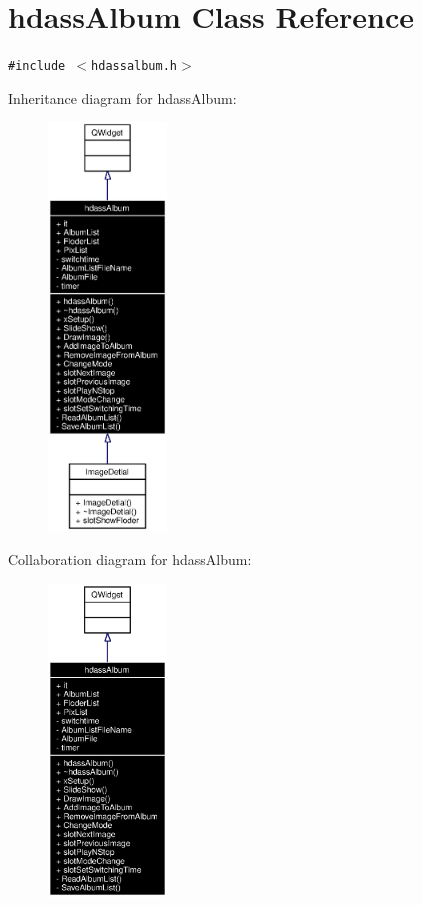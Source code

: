 \section{hdass\-Album Class Reference}
\label{classhdassAlbum}
{\tt \#include $<$hdassalbum.h$>$}

Inheritance diagram for hdass\-Album:\begin{figure}[H]
\begin{center}
\leavevmode
\includegraphics[width=89pt]{classhdassAlbum__inherit__graph}
\end{center}
\end{figure}
Collaboration diagram for hdass\-Album:\begin{figure}[H]
\begin{center}
\leavevmode
\includegraphics[width=89pt]{classhdassAlbum__coll__graph}
\end{center}
\end{figure}


